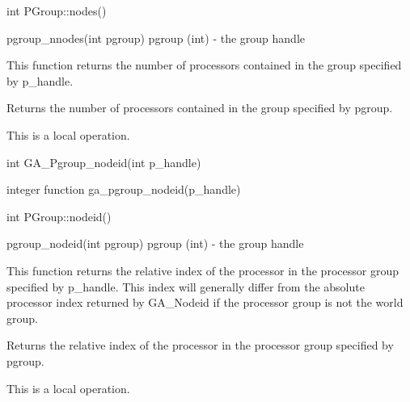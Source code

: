 \documentclass[12pt]{article}
\begin{document}
\begin{cxxapi}
\begin{cxxcode}
int PGroup::nodes()
\end{cxxcode}
\end{cxxapi}

\begin{pyapi}
\begin{pycode}
pgroup_nnodes(int pgroup) 
   pgroup (int)                  - the group handle 
\end{pycode}
\end{pyapi}

\local
\begin{desc}

This function returns the number of processors contained in the group specified by p_handle.

Returns the number of processors contained in the group specified by 
pgroup.

This is a local operation.
\end{desc}


\begin{capi}
\begin{ccode}
int GA_Pgroup_nodeid(int p_handle)
\end{ccode}
\begin{funcargs}
\end{funcargs}
\end{capi}

\begin{fapi}
\begin{fcode}
integer function ga_pgroup_nodeid(p_handle)
\end{fcode}
\begin{funcargs}
\end{funcargs}
\end{fapi}

\begin{cxxapi}
\begin{cxxcode}
int PGroup::nodeid()
\end{cxxcode}
\end{cxxapi}

\begin{pyapi}
\begin{pycode}
pgroup_nodeid(int pgroup) 
   pgroup (int)                  - the group handle
\end{pycode}
\end{pyapi}
\local
\begin{desc}

This function returns the relative index of the processor in the processor group specified by p_handle. This index will generally differ from the absolute processor index returned by GA_Nodeid if the processor group is not the world group.

Returns the relative index of the processor in the processor group 
specified by pgroup.

This is a local operation.

\end{desc}
\end{document}
